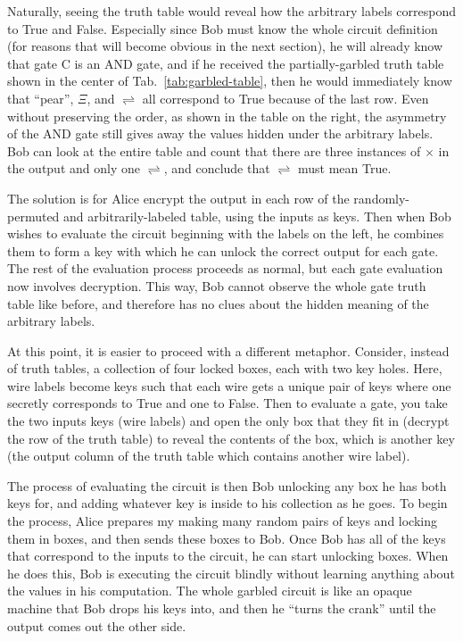 Naturally, seeing the truth table would reveal how the arbitrary labels correspond to True and False. Especially since Bob must know the whole circuit definition (for reasons that will become obvious in the next section), he will already know that gate C is an AND gate, and if he received the partially-garbled truth table shown in the center of Tab.~\ref{tab:garbled-table}, then he would immediately know that ``pear'', $\Xi$, and $\rightleftharpoons$ all correspond to True because of the last row. Even without preserving the order, as shown in the table on the right, the asymmetry of the AND gate still gives away the values hidden under the arbitrary labels. Bob can look at the entire table and count that there are three instances of $\times$ in the output and only one $\rightleftharpoons$, and conclude that $\rightleftharpoons$ must mean True.

The solution is for Alice encrypt the output in each row of the randomly-permuted and arbitrarily-labeled table, using the inputs as keys. Then when Bob wishes to evaluate the circuit beginning with the labels on the left, he combines them to form a key with which he can unlock the correct output for each gate. The rest of the evaluation process proceeds as normal, but each gate evaluation now involves decryption. This way, Bob cannot observe the whole gate truth table like before, and therefore has no clues about the hidden meaning of the arbitrary labels.

At this point, it is easier to proceed with a different metaphor. Consider, instead of truth tables, a collection of four locked boxes, each with two key holes. Here, wire labels become keys such that each wire gets a unique pair of keys where one secretly corresponds to True and one to False. Then to evaluate a gate, you take the two inputs keys (wire labels) and open the only box that they fit in (decrypt the row of the truth table) to reveal the contents of the box, which is another key (the output column of the truth table which contains another wire label).

The process of evaluating the circuit is then Bob unlocking any box he has both keys for, and adding whatever key is inside to his collection as he goes. To begin the process, Alice prepares my making many random pairs of keys and locking them in boxes, and then sends these boxes to Bob. Once Bob has all of the keys that correspond to the inputs to the circuit, he can start unlocking boxes. When he does this, Bob is executing the circuit blindly without learning anything about the values in his computation. The whole garbled circuit is like an opaque machine that Bob drops his keys into, and then he ``turns the crank'' until the output comes out the other side.

